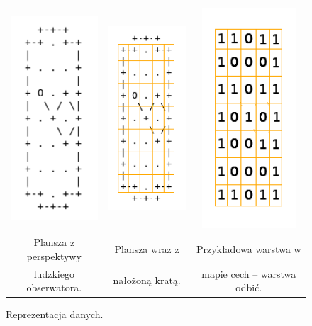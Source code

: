 \documentclass[licencjacka]{pracamgr}
\begin{document}
\begin{itemize}
\begin{figure}
\centering
\setlength{\tabcolsep}{5mm}
\begin{tabular}{ccc}
  \includegraphics[width=35mm]{feature_map} & 
  \includegraphics[width=35mm]{feature_map_grid} & 
  \includegraphics[width=35mm]{dots}\\
  Plansza z perspektywy & 
  Plansza wraz z & 
  Przykładowa warstwa w \\
  ludzkiego obserwatora. & nałożoną kratą. & 
  mapie cech -- warstwa odbić. \\
\end{tabular}
\caption{Reprezentacja danych.}
\end{figure}

\end{itemize}
\end{document}
